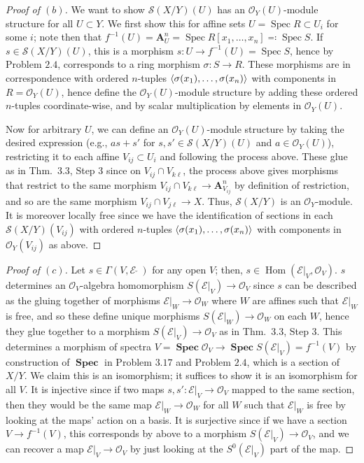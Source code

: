 \documentclass[12pt,letterpaper]{article}
\theoremstyle{definition}
\theoremstyle{remark}
\numberwithin{equation}{section}
\numberwithin{figure}{problem}
\DeclareMathOperator{\Spec}{Spec}
\DeclareMathOperator{\SPEC}{\mathbf{Spec}}
\DeclareMathOperator{\Hom}{Hom}
\newcommand{\EE}{\mathscr{E}}
\newcommand{\OO}{\mathcal{O}}
\newcommand{\Ss}{\mathscr{S}}
\begin{document}
\begin{proof}[Proof of $(b)$]
  We want to show $\Ss(X/Y)(U)$ has an $\OO_Y(U)$-module structure for all $U \subset Y$. We first show this for affine sets $U = \Spec R \subset U_i$ for some $i$; note then that $f^{-1}(U) = \mathbf{A}^n_U = \Spec R[x_1,\ldots,x_n] \eqqcolon \Spec S$. If $s \in \Ss(X/Y)(U)$, this is a morphism $s\colon U \to f^{-1}(U) = \Spec S$, hence by Problem $2.4$, corresponds to a ring morphism $\sigma\colon S \to R$. These morphisms are in correspondence with ordered $n$-tuples $\braket{\sigma(x_1),\ldots,\sigma(x_n)}$ with components in $R = \OO_Y(U)$, hence define the $\OO_Y(U)$-module structure by adding these ordered $n$-tuples coordinate-wise, and by scalar multiplication by elements in $\OO_Y(U)$.
  \par Now for arbitrary $U$, we can define an $\OO_Y(U)$-module structure by taking the desired expression (e.g., $as + s'$ for $s,s' \in \Ss(X/Y)(U)$ and $a \in \OO_Y(U)$), restricting it to each affine $V_{ij} \subset U_i$ and following the process above. These glue as in Thm.~3.3, Step 3 since on $V_{ij} \cap V_{k\ell}$, the process above gives morphisms that restrict to the same morphism $V_{ij} \cap V_{k\ell} \to \mathbf{A}^n_{V_{ij}}$ by definition of restriction, and so are the same morphism $V_{ij} \cap V_{j\ell} \to X$. Thus, $\Ss(X/Y)$ is an $\OO_Y$-module. It is moreover locally free since we have the identification of sections in each $\Ss(X/Y)(V_{ij})$ with ordered $n$-tuples $\braket{\sigma(x_1),\ldots,\sigma(x_n)}$ with components in $\OO_Y(V_{ij})$ as above.
\end{proof}
\begin{proof}[Proof of $(c)$]
  Let $s \in \Gamma(V,\EE\:\check{}\:)$ for any open $V$; then, $s \in \Hom(\EE\vert_V,\OO_V)$. $s$ determines an $\OO_V$-algebra homomorphism $S(\EE\vert_V) \to \OO_V$ since $s$ can be described as the gluing together of morphisms $\EE\vert_W \to \OO_{W}$ where $W$ are affines such that $\EE\vert_W$ is free, and so these define unique morphisms $S(\EE\vert_W) \to \OO_W$ on each $W$, hence they glue together to a morphism $S(\EE\vert_V) \to \OO_V$ as in Thm.~3.3, Step 3. This determines a morphism of spectra $V = \SPEC \OO_V \to \SPEC S(\EE\vert_V) = f^{-1}(V)$ by construction of $\SPEC$ in Problem $3.17$ and Problem $2.4$, which is a section of $X/Y$. We claim this is an isomorphism; it suffices to show it is an isomorphism for all $V$. It is injective since if two maps $s,s' \colon \EE\vert_V \to \OO_V$ mapped to the same section, then they would be the same map $\EE\vert_W \to \OO_W$ for all $W$ such that $\EE\vert_W$ is free by looking at the maps' action on a basis. It is surjective since if we have a section $V \to f^{-1}(V)$, this corresponds by above to a morphism $S(\EE\vert_V) \to \OO_V$, and we can recover a map $\EE\vert_V \to \OO_V$ by just looking at the $S^0(\EE\vert_V)$ part of the map.
\end{proof}
\end{document}
